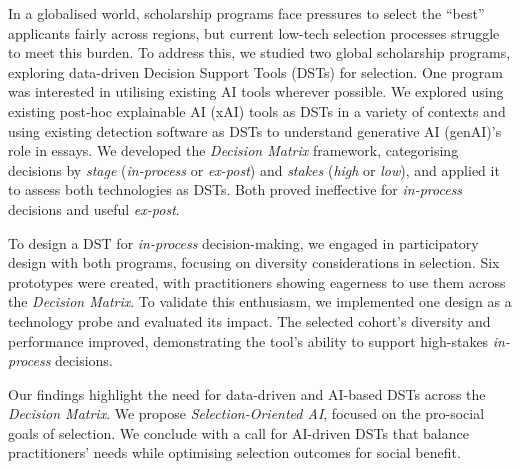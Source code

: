 In a globalised world, scholarship programs face pressures to select the ``best'' applicants fairly across regions, but current low-tech selection processes struggle to meet this burden. To address this, we studied two global scholarship programs, exploring data-driven Decision Support Tools (DSTs) for selection. One program was interested in utilising existing AI tools wherever possible. We explored using existing post-hoc explainable AI (xAI) tools as DSTs in a variety of contexts and using existing detection software as DSTs to understand generative AI (genAI)'s role in essays. We developed the \emph{Decision Matrix} framework, categorising decisions by \emph{stage} (\emph{in-process} or \emph{ex-post}) and \emph{stakes} (\emph{high} or \emph{low}), and applied it to assess both technologies as DSTs. Both proved ineffective for \emph{in-process} decisions and useful \emph{ex-post}.

To design a DST for \emph{in-process} decision-making, we engaged in participatory design with both programs, focusing on diversity considerations in selection. Six prototypes were created, with practitioners showing eagerness to use them across the \emph{Decision Matrix}. To validate this enthusiasm, we implemented one design as a technology probe and evaluated its impact. The selected cohort's diversity and performance improved, demonstrating the tool's ability to support high-stakes \emph{in-process} decisions.

Our findings highlight the need for data-driven and AI-based DSTs across the \emph{Decision Matrix}. We propose \emph{Selection-Oriented AI}, focused on the pro-social goals of selection. We conclude with a call for AI-driven DSTs that balance practitioners' needs while optimising selection outcomes for social benefit.